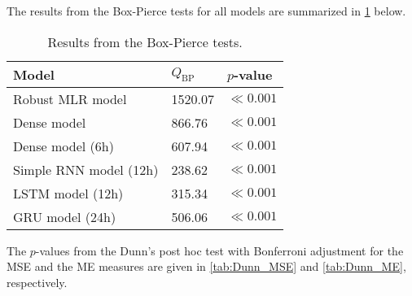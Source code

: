 \label{chapt:appendix_C}

The results from the Box-Pierce tests for all models are summarized in \cref{tab:boxpierce} below. 
\begin{table}[h]
\small
\centering
\caption{Results from the Box-Pierce tests.}
\label{tab:boxpierce}
\begin{tabular}{@{}lll@{}}
\toprule
Model                  & $Q_{\text{BP}}$ & $p$-value             \\ \midrule
Robust MLR model       & 1520.07         & $\ll0.001$ \\
Dense model            & 866.76          & $\ll0.001$  \\
Dense model (6h)       & 607.94          & $\ll0.001$ \\
Simple RNN model (12h) & 238.62          & $\ll0.001$  \\
LSTM model (12h)       & 315.34          & $\ll0.001$  \\
GRU model (24h)        & 506.06          & $\ll0.001$ \\ \bottomrule
\end{tabular}
\end{table}

\noindent
The $p$-values from the Dunn's post hoc test with Bonferroni adjustment for the MSE and the ME measures are given in \cref{tab:Dunn_MSE} and \cref{tab:Dunn_ME}, respectively. 

\begin{table}[h]
\centering
\caption{$p$-values for the pairwise comparisons from the Dunn's post hoc test for the MSE. }
\label{tab:Dunn_MSE}
\end{table}

